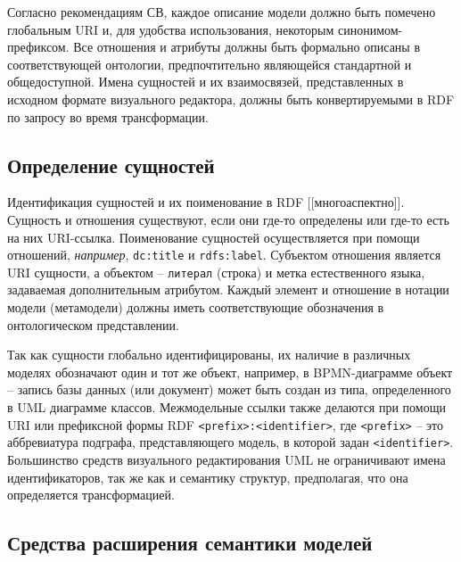 \documentclass[conference]{IEEEtran} \IEEEoverridecommandlockouts
\begin{document}
Согласно рекомендациям СВ, каждое описание модели должно быть помечено глобальным URI и, для удобства использования, некоторым синонимом-префиксом. Все отношения и атрибуты должны быть формально описаны в соответствующей онтологии, предпочтительно являющейся стандартной и общедоступной. Имена сущностей и их взаимосвязей, представленных в исходном формате визуального редактора, должны быть конвертируемыми в RDF по запросу во время трансформации.

\subsection{Определение сущностей} \label{sec:ent-def}

Идентификация сущностей и их поименование в RDF [[многоаспектно]]. Сущность и отношения существуют, если они где-то определены или где-то есть на них URI-ссылка. Поименование сущностей осуществляется при помощи отношений, \emph{например}, \texttt{dc:title} и \texttt{rdfs:label}. Субъектом отношения является URI сущности, а объектом -- \texttt{литерал} (строка) и метка естественного языка, задаваемая дополнительным атрибутом. Каждый элемент и отношение в нотации модели (метамодели) должны иметь соответствующие обозначения в онтологическом представлении.

Так как сущности глобально идентифицированы, их наличие в различных моделях обозначают один и тот же объект, например, в BPMN-диаграмме объект -- запись базы данных (или документ) может быть создан из типа, определенного в UML диаграмме классов. Межмодельные ссылки также делаются при помощи URI или префиксной формы RDF \texttt{<prefix>:<identifier>}, где \texttt{<prefix>} -- это аббревиатура подграфа, представляющего модель, в которой задан \texttt{<identifier>}. Большинство средств визуального редактирования UML не ограничивают имена идентификаторов, так же как и семантику структур, предполагая, что она определяется трансформацией.

\subsection{Средства расширения семантики моделей} \label{sec:mod-ext}
\end{document}
